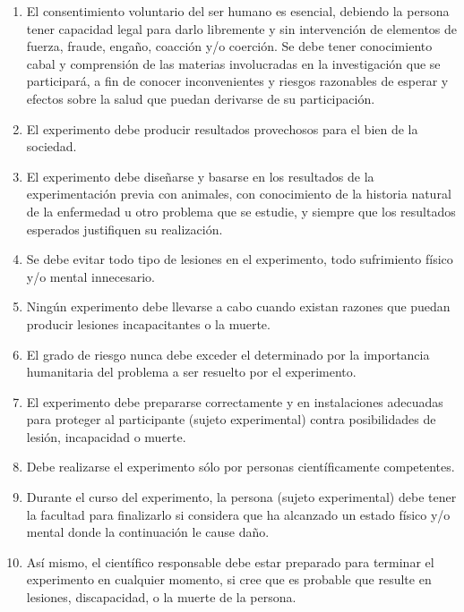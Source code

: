 \begin{enumerate}
    \item El consentimiento voluntario del ser humano es esencial, debiendo la persona tener capacidad
    legal para darlo libremente y sin intervención de elementos de fuerza, fraude, engaño, coacción
    y/o coerción. Se debe tener conocimiento cabal y comprensión de las materias involucradas en la
    investigación que se participará, a fin de conocer inconvenientes y riesgos razonables de esperar
    y efectos sobre la salud que puedan derivarse de su participación.
    \item El experimento debe producir resultados provechosos para el bien de la sociedad.
    \item El experimento debe diseñarse y basarse en los resultados de la experimentación previa con
    animales, con conocimiento de la historia natural de la enfermedad u otro problema que se
    estudie, y siempre que los resultados esperados justifiquen su realización.
    \item Se debe evitar todo tipo de lesiones en el experimento, todo sufrimiento físico y/o mental
    innecesario.
    \item Ningún experimento debe llevarse a cabo cuando existan razones que puedan producir lesiones
    incapacitantes o la muerte.
    \item El grado de riesgo nunca debe exceder el determinado por la importancia humanitaria del
    problema a ser resuelto por el experimento.
    \item El experimento debe prepararse correctamente y en instalaciones adecuadas para proteger al
    participante (sujeto experimental) contra posibilidades de lesión, incapacidad o muerte.
    \item Debe realizarse el experimento sólo por personas científicamente competentes.
    \item Durante el curso del experimento, la persona (sujeto experimental) debe tener la facultad para
    finalizarlo si considera que ha alcanzado un estado físico y/o mental donde la continuación le
    cause daño.
    \item  Así mismo, el científico responsable debe estar preparado para terminar el experimento en
    cualquier momento, si cree que es probable que resulte en lesiones, discapacidad, o la muerte de
    la persona.
\end{enumerate}